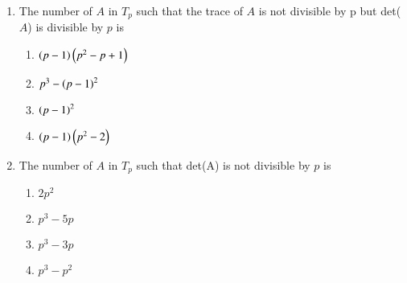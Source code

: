 \documentclass[journal,12pt,twocolumn]{IEEEtran}
\theoremstyle{remark}
\begin{document}
\begin{multicols}{2}
\begin{enumerate}
		\item The number of $A$ in $T_p$ such that the trace of $A$ is not divisible by p but det($A$) is divisible by $p$ is

			
			\begin{enumerate}
				\item $\left(p-1\right)\left(p^2-p+1\right)$
				\item $p^3-\left(p-1\right)^2$
				\item $\left(p-1\right)^2$
				\item $\left(p-1\right)\left(p^2-2\right)$
			\end{enumerate}

		\item The number of $A$ in $T_p$ such that det(A) is not divisible by $p$ is 
			\begin{enumerate}
				\item $2p^2$
				\item $p^3-5p$
				\item $p^3-3p$
				\item $p^3-p^2$
			\end{enumerate}

	\end{enumerate}

\end{multicols}
\end{document}

